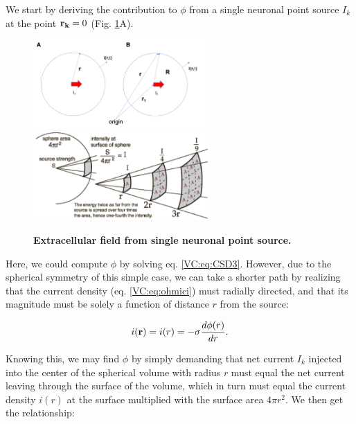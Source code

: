 \subsubsection{}
We start by deriving the contribution to $\phi$ from a single neuronal point source $I_k$ at the point ${\bf r_k}=0$ (Fig. \ref{VC:fig:pointsource}A). 

\begin{figure}[!ht]
\begin{center}
\includegraphics[width=0.6\textwidth]{Figures/VC/Pointsource.png}
\includegraphics[width=0.6\textwidth]{Figures/VC/pointsource_3D_illustration.png}
\end{center}
\caption{\textbf{Extracellular field from single neuronal point source.} 
}
\label{VC:fig:pointsource}
\end{figure}

Here, we could compute $\phi$ by solving eq. \ref{VC:eq:CSD3}. However, due to the spherical symmetry of this simple case, we can take a shorter path by realizing that the current density (eq. \ref{VC:eq:ohmici}) must radially directed, and that its magnitude must be solely a function of distance $r$ from the source:

\begin{equation}
i({\bf r}) = i(r) = -\sigma \frac{d\phi(r)}{dr}.
\end{equation}

Knowing this, we may find $\phi$ by simply demanding that net current $I_k$ injected into the center of the spherical volume with radius $r$ must equal the net current leaving through the surface of the volume, which in turn must equal the current density $i(r)$ at the surface multiplied with the surface area $4\pi r^2$. We then get the relationship:

